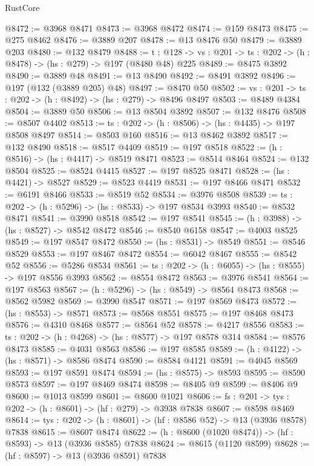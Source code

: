 \begin{lexlean}{RustCore}
\begin{coremodule}
@8472 := @3968 @8471
@8473 := @3968 @8472
@8474 := @159 @8473
@8475 := @275 @8462
@8476 := @3889 @207
@8478 := @13 @8476 @50
@8479 := @3889 @203
@8480 := @132 @8479
@8488 := {t : @128} ->
  {vs : @201} -> {ts : @202} -> (h : @8478) -> (hs : @279) -> @197 (@8480 @48) @225
@8489 := @8475 @3892
@8490 := @3889 @48
@8491 := @13 @8490
@8492 := @8491 @3892
@8496 := @197 (@132 (@3889 @205) @48)
@8497 := @8470 @50
@8502 := {vs : @201} -> {ts : @202} -> (h : @8492) -> (hs : @279) -> @8496 @8497
@8503 := @8489 @4384
@8504 := @3889 @50
@8506 := @13 @8504 @3892
@8507 := @132 @8476
@8508 := @8507 @4402
@8513 := {ts : @202} -> (h : @8506) -> (hs : @4435) -> @197 @8508 @8497
@8514 := @8503 @160
@8516 := @13 @8462 @3892
@8517 := @132 @8490
@8518 := @8517 @4409
@8519 := @197 @8518
@8522 := (h : @8516) -> (hs : @4417) -> @8519 @8471
@8523 := @8514 @8464
@8524 := @132 @8504
@8525 := @8524 @4415
@8527 := @197 @8525 @8471
@8528 := (hs : @4421) -> @8527
@8529 := @8523 @4419
@8531 := @197 @8466 @8471
@8532 := @6191 @8466
@8533 := @8519 @52
@8534 := @3976 @8508
@8539 := {ts : @202} -> (h : @5296) -> (hs : @8533) -> @197 @8534 @3993
@8540 := @8532 @8471
@8541 := @3990 @8518
@8542 := @197 @8541
@8545 := (h : @3988) -> (hs : @8527) -> @8542 @8472
@8546 := @8540 @6158
@8547 := @4003 @8525
@8549 := @197 @8547 @8472
@8550 := (hs : @8531) -> @8549
@8551 := @8546 @8529
@8553 := @197 @8467 @8472
@8554 := @6042 @8467
@8555 := @8542 @52
@8556 := @5286 @8534
@8561 := {ts : @202} -> (h : @6055) -> (hs : @8555) -> @197 @8556 @3993
@8562 := @8554 @8472
@8563 := @3976 @8541
@8564 := @197 @8563
@8567 := (h : @5296) -> (hs : @8549) -> @8564 @8473
@8568 := @8562 @5982
@8569 := @3990 @8547
@8571 := @197 @8569 @8473
@8572 := (hs : @8553) -> @8571
@8573 := @8568 @8551
@8575 := @197 @8468 @8473
@8576 := @4310 @8468
@8577 := @8564 @52
@8578 := @4217 @8556
@8583 := {ts : @202} -> (h : @4268) -> (hs : @8577) -> @197 @8578 @314
@8584 := @8576 @8473
@8585 := @4031 @8563
@8586 := @197 @8585
@8589 := (h : @4122) -> (hs : @8571) -> @8586 @8474
@8590 := @8584 @4121
@8591 := @4045 @8569
@8593 := @197 @8591 @8474
@8594 := (hs : @8575) -> @8593
@8595 := @8590 @8573
@8597 := @197 @8469 @8474
@8598 := @8405 @9
@8599 := @8406 @9
@8600 := @1013 @8599
@8601 := @8600 @1021
@8606 := {fs : @201} -> {tys : @202} -> (h : @8601) -> (hf : @279) -> @3938 @7838
@8607 := @8598 @8469
@8614 := {tys : @202} -> (h : @8601) -> (hf : @8586 @52) -> @13 (@3936 @8578) @7838
@8615 := @8607 @8474
@8622 := (h : @8600 (@1020 @8474)) -> (hf : @8593) -> @13 (@3936 @8585) @7838
@8624 := @8615 (@1120 @8599)
@8628 := (hf : @8597) -> @13 (@3936 @8591) @7838

\end{coremodule}
\end{lexlean}
